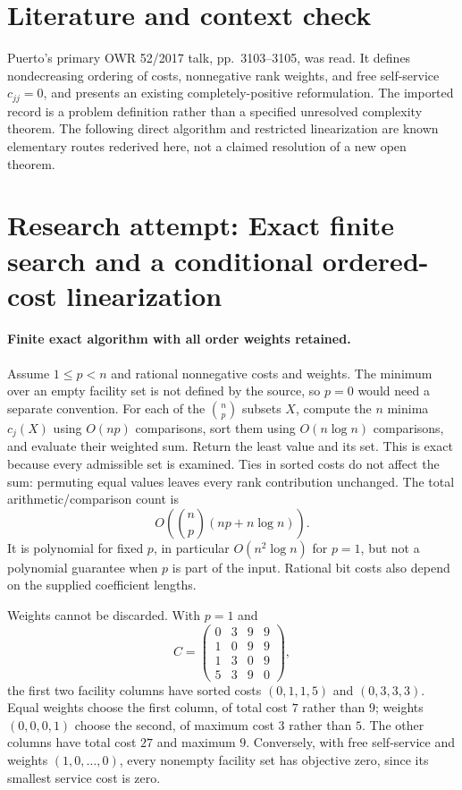 \documentclass[11pt]{article}
\begin{document}
\section{Literature and context check}
Puerto's primary OWR 52/2017 talk, pp.~3103--3105, was read. It defines nondecreasing ordering of costs, nonnegative rank weights, and free self-service $c_{jj}=0$, and presents an existing completely-positive reformulation. The imported record is a problem definition rather than a specified unresolved complexity theorem. The following direct algorithm and restricted linearization are known elementary routes rederived here, not a claimed resolution of a new open theorem.
\section{Research attempt: Exact finite search and a conditional ordered-cost linearization}

\paragraph{Finite exact algorithm with all order weights retained.}
Assume $1\le p<n$ and rational nonnegative costs and weights. The minimum over an empty facility set is not defined by the source, so $p=0$ would need a separate convention. For each of the $\binom np$ subsets $X$, compute the $n$ minima $c_j(X)$ using $O(np)$ comparisons, sort them using $O(n\log n)$ comparisons, and evaluate their weighted sum. Return the least value and its set. This is exact because every admissible set is examined. Ties in sorted costs do not affect the sum: permuting equal values leaves every rank contribution unchanged. The total arithmetic/comparison count is
\[
 O\left(\binom np(np+n\log n)\right).
\]
It is polynomial for fixed $p$, in particular $O(n^2\log n)$ for $p=1$, but not a polynomial guarantee when $p$ is part of the input. Rational bit costs also depend on the supplied coefficient lengths.

Weights cannot be discarded. With $p=1$ and
\[
 C=\begin{pmatrix}0&3&9&9\\1&0&9&9\\1&3&0&9\\5&3&9&0\end{pmatrix},
\]
the first two facility columns have sorted costs $(0,1,1,5)$ and $(0,3,3,3)$. Equal weights choose the first column, of total cost $7$ rather than $9$; weights $(0,0,0,1)$ choose the second, of maximum cost $3$ rather than $5$. The other columns have total cost $27$ and maximum $9$. Conversely, with free self-service and weights $(1,0,\ldots,0)$, every nonempty facility set has objective zero, since its smallest service cost is zero.
\end{document}
